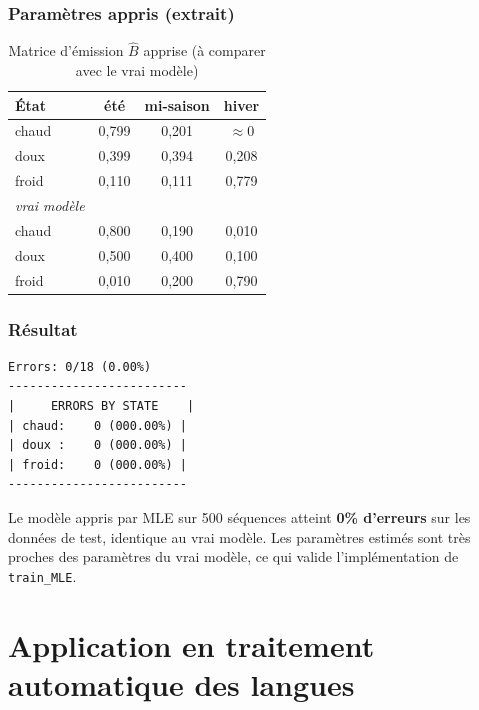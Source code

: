 \documentclass[12pt,a4paper]{article}
\begin{document}
\subsubsection*{Paramètres appris (extrait)}

\begin{table}[H]
\centering
\caption{Matrice d'émission $\hat{B}$ apprise (à comparer avec le vrai modèle)}
\begin{tabular}{lccc}
\toprule
\textbf{État} & \textbf{été} & \textbf{mi-saison} & \textbf{hiver} \\
\midrule
chaud & 0,799 & 0,201 & $\approx 0$ \\
doux  & 0,399 & 0,394 & 0,208 \\
froid & 0,110 & 0,111 & 0,779 \\
\midrule
\textit{vrai modèle} & & & \\
chaud & 0,800 & 0,190 & 0,010 \\
doux  & 0,500 & 0,400 & 0,100 \\
froid & 0,010 & 0,200 & 0,790 \\
\bottomrule
\end{tabular}
\end{table}

\subsubsection*{Résultat}

\begin{lstlisting}[style=outputstyle]
Errors: 0/18 (0.00%)
-------------------------
|     ERRORS BY STATE    |
| chaud:    0 (000.00%) |
| doux :    0 (000.00%) |
| froid:    0 (000.00%) |
-------------------------
\end{lstlisting}

\begin{resultbox}
Le modèle appris par MLE sur 500 séquences atteint \textbf{0\% d'erreurs} sur les données
de test, identique au vrai modèle. Les paramètres estimés sont très proches des paramètres
du vrai modèle, ce qui valide l'implémentation de \texttt{train\_MLE}.
\end{resultbox}

\section{Application en traitement automatique des langues}
\end{document}
